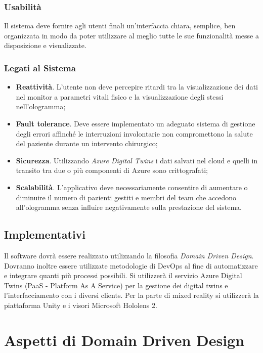 \subsubsection{Usabilità}
Il sistema deve fornire agli utenti finali un’interfaccia chiara, semplice, ben organizzata in modo da poter utilizzare al meglio tutte le sue funzionalità messe a disposizione e visualizzate.

\subsubsection{Legati al Sistema}
\begin{itemize}
    \item \textbf{Reattività}. L'utente non deve percepire ritardi tra la visualizzazione dei dati nel monitor a parametri vitali fisico e la visualizzazione degli stessi nell'ologramma;
    
    \item \textbf{Fault tolerance}. Deve essere implementato un adeguato sistema di gestione degli errori affinché le interruzioni involontarie non compromettono la salute del paziente durante un intervento chirurgico;
    
    \item \textbf{Sicurezza}. Utilizzando \textit{Azure Digital Twins} i dati salvati nel cloud e quelli in transito tra due o più componenti di Azure sono crittografati;
    
    \item \textbf{Scalabilità}. L’applicativo deve necessariamente consentire di aumentare o diminuire il numero di pazienti gestiti e membri del team che accedono  all'ologramma senza influire negativamente sulla prestazione del sistema. 
\end{itemize}

\subsection{Implementativi}
Il software dovrà essere realizzato utilizzando la filosofia \textit{Domain Driven Design}. Dovranno inoltre essere utilizzate metodologie di DevOps al fine di automatizzare e integrare quanti più processi possibili. Si utilizzerà il servizio Azure Digital Twins (PaaS - Platform As A Service) per la gestione dei digital twins e l'interfacciamento con i diversi clients. Per la parte di mixed reality si utilizzerà la piattaforma Unity e i visori Microsoft Hololens 2.

\section{Aspetti di Domain Driven Design}

